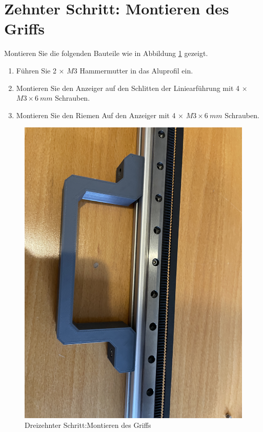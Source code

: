 \section{Zehnter Schritt: Montieren des Griffs}
Montieren Sie die folgenden Bauteile wie in Abbildung \ref{10.S} gezeigt.

\begin{enumerate}
	\item Führen Sie 2 $\times$ $ M3 $ Hammermutter in das Aluprofil ein.
	\item Montieren Sie den Anzeiger auf den Schlitten der Liniearführung mit 4 $\times$ $ M3 \times 6 \ mm $ Schrauben.
	\item Montieren Sie den Riemen Auf den Anzeiger mit 4 $\times$ $ M3 \times 6 \ mm $ Schrauben.
\end{enumerate}

\begin{figure}[H]
	\begin{center}
		\includegraphics[width=\textwidth]{Images/10Schr.jpg}
		\caption{Dreizehnter Schritt:Montieren des Griffs} \label{10.S}
	\end{center}
\end{figure}


